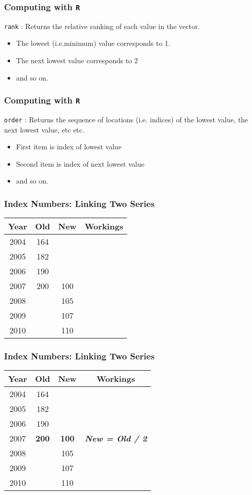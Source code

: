 
\frametitle{Computing with \texttt{R}}
\LARGE
 \texttt{rank} : Returns the relative ranking of each value in the vector.
\begin{itemize}
\item The lowest (i.e.minimum) value corresponds to 1.
\item The next lowest value corresponds to 2
\item and so on.
\end{itemize}


\frametitle{Computing with \texttt{R}}
\LARGE
 \texttt{order} : Returns the sequence of locations (i.e. indices) of the lowest value, the next lowest value, etc etc.

\begin{itemize}
\item First item is index of lowest value
\item Second item is index of next lowest value
\item and so on.
\end{itemize}



\frametitle{Index Numbers: Linking Two Series}

\begin{tabular}
{|c|c|c|c|}
Year	&	Old	&	New	&	Workings	\\ \hline
2004	&	164	&		&		\\ \hline
2005	&	182	&		&		\\ \hline
2006	&	190	&		&		\\ \hline
2007	&	200	&	100	&		\\ \hline
2008	&		&	105	&		\\ \hline
2009	&		&	107	&		\\ \hline
2010	&		&	110	&		\\ \hline
\end{tabular}  


\frametitle{Index Numbers: Linking Two Series}
\Large
\begin{center}
\begin{tabular}
{|c||c|c||c|}
\hline
Year	&\phantom{sp}	Old	\phantom{sp}&\phantom{sp}	New\phantom{sp}	&	Workings	\\ \hline \hline
2004	&	164	&		&		\\ \hline
2005	&	182	&		&		\\ \hline
2006	&	190	&		&		\\ \hline
2007	&	\textbf{200}	&	\textbf{100}	&	\textit{\textbf{New = Old / 2}}	\\ \hline
2008	&		&	105	&		\\ \hline
2009	&		&	107	&		\\ \hline
2010	&		&	110	&		\\ \hline
\end{tabular}  
\end{center}


